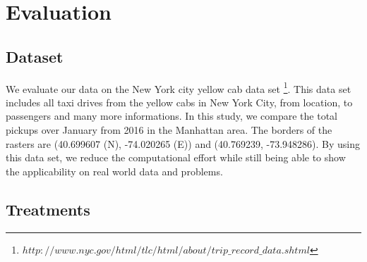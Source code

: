 \documentclass{itatnew}
\newcommand{\SOHUP}{
  \ifmmode
    SoH^\uparrow
  \else
  \begin{math}\SOHUP\end{math}
  \fi
}
\newcommand{\SOHDOWN}{
  \ifmmode
    SoH^\downarrow
  \else
  \begin{math}\SOHDOWN\end{math}
  \fi
}
\begin{document}
\section{Evaluation}

\subsection{Dataset}

We evaluate our data on the New York city yellow cab data set 
\footnote{$http://www.nyc.gov/html/tlc/html/about/trip\_record\_data.shtml$}. 
This data set includes all taxi drives from the yellow cabs in New York City, 
from location, to passengers and many more informations. In this study, we compare the 
total pickups over January from 2016 in the Manhattan area. 
The borders of the rasters are (40.699607 \textdegree  (N), -74.020265 \textdegree  (E)) and (40.769239, -73.948286).
By using this data set, we reduce the computational effort while still 
being able to show the applicability on real world data and problems.
\subsection{Treatments}

%  
%    
%    
%    

\end{document}
